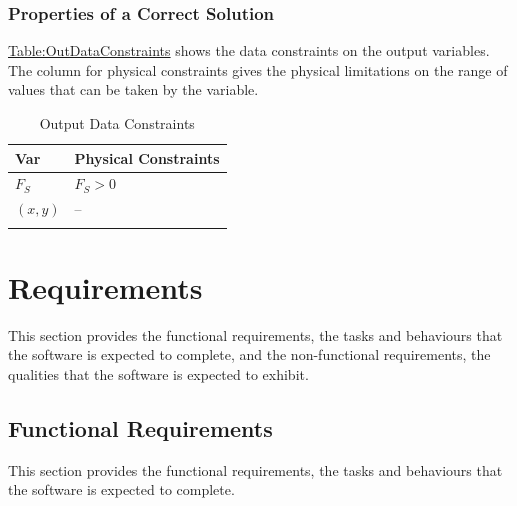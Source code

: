 \documentclass[12pt]{article}
\begin{document}
\subsubsection{Properties of a Correct Solution}
\label{Sec:CorSolProps}
\hyperref[Table:OutDataConstraints]{Table:OutDataConstraints} shows the data constraints on the output variables. The column for physical constraints gives the physical limitations on the range of values that can be taken by the variable.

\begin{longtable}{l l}
\toprule
\textbf{Var} & \textbf{Physical Constraints}
\\
\midrule
\endhead
${F_{S}}$ & ${F_{S}}>0$
\\
$(x,y)$ & --
\\
\bottomrule
\caption{Output Data Constraints}
\label{Table:OutDataConstraints}
\end{longtable}
\section{Requirements}
\label{Sec:Requirements}
This section provides the functional requirements, the tasks and behaviours that the software is expected to complete, and the non-functional requirements, the qualities that the software is expected to exhibit.

\subsection{Functional Requirements}
\label{Sec:FRs}
This section provides the functional requirements, the tasks and behaviours that the software is expected to complete.
\end{document}
